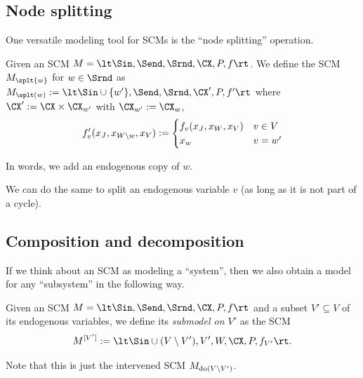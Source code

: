 \subsection{Node splitting}

One versatile modeling tool for SCMs is the ``node splitting'' operation.
\begin{Def}
Given an SCM $M = \lt \Sin, \Send, \Srnd, \CX, P, f \rt$.
We define the SCM $M_{\splt{w}}$ for $w \in \Srnd$ as
$M_{\splt(w)} := \lt \Sin \cup \{w'\}, \Send, \Srnd, \CX', P, f' \rt$
where $\CX' := \CX \times \CX_{w'}$ with $\CX_{w'} := \CX_w$, 
  $$f_v'(x_J,x_{W\setminus w},x_V) := \begin{cases}
    f_v(x_J,x_W,x_V) & v \in V \\
    x_w & v = w'
  \end{cases}
  $$
\end{Def}
In words, we add an endogenous copy of $w$.

We can do the same to split an endogenous variable $v$ (as long as it is not part of a cycle).

\subsection{Composition and decomposition}

If we think about an SCM as modeling a ``system'', then we also obtain a model for any ``subsystem'' in the following way.
\begin{Def}\label{def:sub_scm}
  Given an SCM $M = \lt \Sin, \Send, \Srnd, \CX, P, f \rt$ and a subset $V' \subseteq V$ of its endogenous variables, we define its \emph{submodel on $V'$} as the SCM
  $$M^{[V']} := \lt \Sin \cup (V \sm V'), V', W,\CX,P,f_{V'} \rt.$$
\end{Def}
\begin{Rem}
  Note that this is just the intervened SCM $M_{\operatorname{do}(V \setminus V')}$.
\end{Rem}


